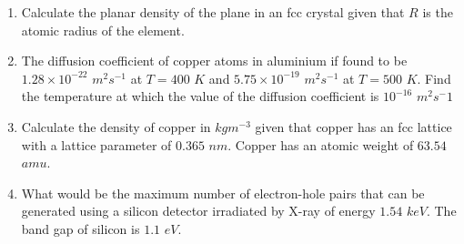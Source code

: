 \documentclass[journal,12pt,onecolumn]{IEEEtran}
\theoremstyle{remark}
\begin{document}
\begin{enumerate}
\item Calculate the planar density of the  plane in an fcc crystal given that $R$ is the atomic radius of the element.

\hfill{}
\begin{enumerate}
\end{enumerate}

\item The diffusion coefficient of copper atoms in aluminium if found to be $1.28\times 10^{-22}$ $m^2s^{-1}$ at $T=400$ $K$ and $5.75\times 10^{-19}$ $m^2s^{-1}$ at $T=500$ $K$. Find the temperature  at which the value of the diffusion coefficient is $10^{-16}$ $m^2s^-1$

\hfill{}

\item Calculate the density of copper in $kgm^{-3}$ given that copper has an fcc lattice with a lattice parameter of $0.365$ $nm$. Copper has an atomic weight of $63.54$ $amu$.

\hfill{}

\item What would be the maximum number of electron-hole pairs that can be generated using a silicon detector irradiated by X-ray of energy $1.54$ $keV$. The band gap of silicon is $1.1$ $eV$.

\hfill{}

\end{enumerate}
\end{document}
